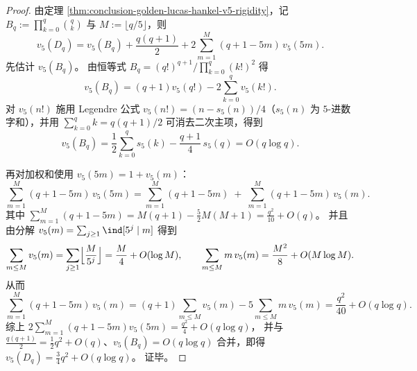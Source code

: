 \begin{proof}
由定理 \ref{thm:conclusion-golden-lucas-hankel-v5-rigidity}，记
\(
B_q:=\prod_{k=0}^{q}\binom{q}{k}
\)
与 \(M:=\lfloor q/5\rfloor\)，则
\[
v_5(D_q)=v_5(B_q)+\frac{q(q+1)}{2}
+2\sum_{m=1}^{M}(q+1-5m)\,v_5(5m).
\]
先估计 \(v_5(B_q)\)。
由恒等式
\(
B_q=(q!)^{q+1}/\prod_{k=0}^{q}(k!)^2
\)
得
\[
v_5(B_q)=(q+1)v_5(q!)-2\sum_{k=0}^{q}v_5(k!).
\]
对 \(v_5(n!)\) 施用 Legendre 公式 \(v_5(n!)=(n-s_5(n))/4\)（\(s_5(n)\) 为 \(5\)-进数字和），并用 \(\sum_{k=0}^{q}k=q(q+1)/2\) 可消去二次主项，得到
\[
v_5(B_q)=\frac12\sum_{k=0}^{q}s_5(k)-\frac{q+1}{4}\,s_5(q)=O(q\log q).
\]
\par
再对加权和使用 \(v_5(5m)=1+v_5(m)\)：
\[
\sum_{m=1}^{M}(q+1-5m)\,v_5(5m)
=\sum_{m=1}^{M}(q+1-5m)
\;+\;
\sum_{m=1}^{M}(q+1-5m)\,v_5(m).
\]
其中
\(
\sum_{m=1}^{M}(q+1-5m)=M(q+1)-\frac{5}{2}M(M+1)=\frac{q^2}{10}+O(q)
\)。
并且由分解 \(v_5(m)=\sum_{j\ge 1}\ind[5^j\mid m]\) 得到
\[
\sum_{m\le M}v_5(m)=\sum_{j\ge 1}\Bigl\lfloor\frac{M}{5^j}\Bigr\rfloor=\frac{M}{4}+O(\log M),
\qquad
\sum_{m\le M}m\,v_5(m)=\frac{M^2}{8}+O(M\log M).
\]
从而
\[
\sum_{m=1}^{M}(q+1-5m)\,v_5(m)
=(q+1)\sum_{m\le M}v_5(m)-5\sum_{m\le M}m\,v_5(m)
=\frac{q^2}{40}+O(q\log q).
\]
综上
\(
2\sum_{m=1}^{M}(q+1-5m)v_5(5m)=\frac{q^2}{4}+O(q\log q)
\)，
并与 \(\frac{q(q+1)}{2}=\frac12q^2+O(q)\)、\(v_5(B_q)=O(q\log q)\) 合并，即得
\(
v_5(D_q)=\frac34q^2+O(q\log q)
\)。
证毕。
\end{proof}

\endinput
